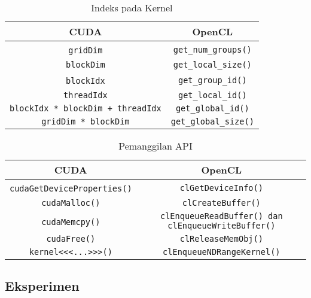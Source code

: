 \begin{table}
	\centering
	\caption{Indeks pada Kernel}
	\label{tab:indeks_pada_kernel}
	\begin{tabular}{|c|c|}
		\rowcolor[gray]{.9} \hline \rule[-2ex]{0pt}{5.5ex} CUDA & OpenCL \\ 
		\hline \rule[-2ex]{0pt}{5.5ex} \verb|gridDim|​ & \verb|get_num_groups()| \\ 
		\hline \rule[-2ex]{0pt}{5.5ex} \verb|blockDim| & \verb|get_local_size()​| \\ 
		\hline \rule[-2ex]{0pt}{5.5ex} \verb|blockIdx|​ & \verb|get_group_id()| \\ 
		\hline \rule[-2ex]{0pt}{5.5ex} \verb|threadIdx| & \verb|get_local_id()| \\ 
		\hline \rule[-2ex]{0pt}{5.5ex} \verb|blockIdx * blockDim + threadIdx| & \verb|get_global_id()| \\ 
		\hline \rule[-2ex]{0pt}{5.5ex} \verb|gridDim * blockDim| & \verb|get_global_size()| \\ 		
		\hline 
	\end{tabular} 
\end{table}

\begin{table}
	\centering
	\caption{Pemanggilan API}
	\label{tab:pemanggilan_api}
	\begin{tabular}{|c|c|}
		\rowcolor[gray]{.9} \hline \rule[-2ex]{0pt}{5.5ex} CUDA & OpenCL \\ 
		\hline \rule[-2ex]{0pt}{5.5ex} \verb|cudaGetDeviceProperties()|​ & \verb|clGetDeviceInfo()| \\ 
		\hline \rule[-2ex]{0pt}{5.5ex} \verb|cudaMalloc()| & \verb|clCreateBuffer()| \\ 
		\hline \rule[-2ex]{0pt}{5.5ex} \verb|cudaMemcpy()|​ & \verb|clEnqueueReadBuffer()​ dan clEnqueueWriteBuffer()| \\ 
		\hline \rule[-2ex]{0pt}{5.5ex} \verb|cudaFree()| & \verb|clReleaseMemObj()| \\ 
		\hline \rule[-2ex]{0pt}{5.5ex} \verb|kernel<<<...>>>()| & \verb|clEnqueueNDRangeKernel()| \\ 
		\hline 
	\end{tabular} 
\end{table}

\subsection{Eksperimen}
